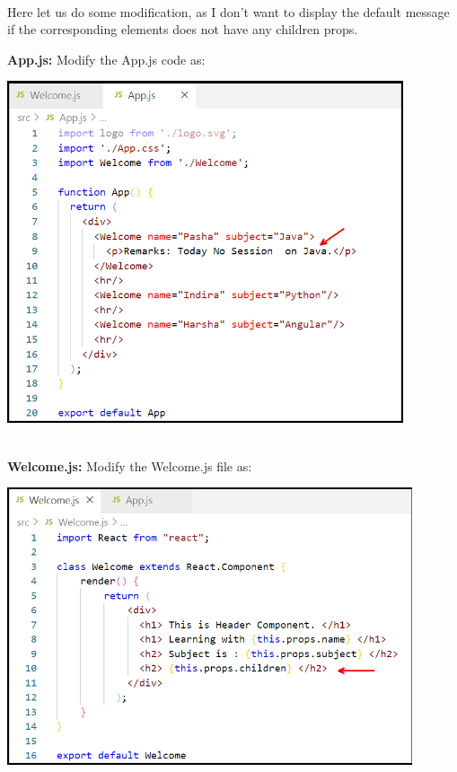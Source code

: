 \documentclass{article}
\begin{document}
\noindent 

\noindent 

\noindent \\
Here let us do some modification, as I don't want to display the default message if the corresponding elements does not have any children props.

\noindent 
\newpage
\noindent 
\textbf{App.js:} Modify the App.js code as:

\begin{center}
	\noindent \includegraphics*[width=4.59in, height=3.97in]{IMG-08-21}
\end{center}

\noindent \\
\textbf{Welcome.js:} Modify the Welcome.js file as:

\begin{center}
	\noindent \includegraphics*[width=4.70in, height=3.22in]{IMG-08-22}
\end{center}
\end{document}
